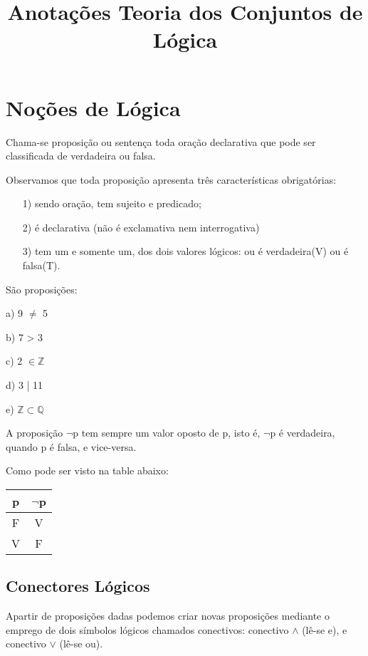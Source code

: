 \documentclass[10pt,a4paper]{article}
\title{Anotações Teoria dos Conjuntos de Lógica}
\begin{document}
\maketitle
\tableofcontents
\newpage

\section{Noções de Lógica}
\begin{df}
	Chama-se proposição ou sentença toda oração declarativa que pode ser classificada de verdadeira ou falsa.
\end{df}

Observamos que toda proposição apresenta três características obrigatórias:

\begin{itemize}
	\item[1)] sendo oração, tem sujeito e predicado;
	\item[2)] é declarativa (não é exclamativa nem interrogativa)
	\item[3)] tem um e somente um, dos dois valores lógicos: ou é verdadeira(V) ou é falsa(T).
\end{itemize}

\begin{eg}
	São proposições:
	
	\item[a)] 9 $\neq$ 5
	\item[b)] 7 > 3
	\item[c)] 2 $\in \mathbb{Z}$
	\item[d)] 3 | 11
	\item[e)] $\mathbb{Z} \subset \mathbb{Q}$ 
\end{eg}

\begin{df}
	A proposição $\neg$p tem sempre um valor oposto de p, isto é, $\neg$p é verdadeira, quando p é falsa, e vice-versa.
\end{df}

Como pode ser visto na table abaixo:

\begin{tabular}{|c|c|}
 \hline 
 p & $\neg$p \\ 
 \hline 
 F & V \\ 
 V & F\\
 \hline 
 \end{tabular} 

 
\subsection{Conectores Lógicos}
Apartir de proposições dadas podemos criar novas proposições mediante o emprego de dois símbolos lógicos chamados conectivos: conectivo $\wedge$ (lê-se e), e conectivo $\vee$ (lê-se ou).
\end{document}

